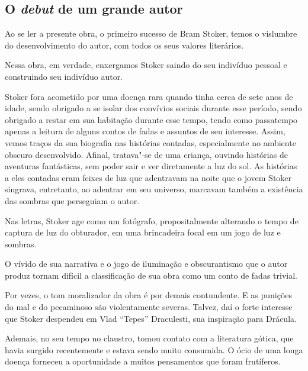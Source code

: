 \documentclass[12pt]{extarticle}
\begin{document}
\subsection{O \textit{debut} de um grande autor}

Ao se ler a presente obra, o primeiro sucesso de Bram Stoker, temos o
vislumbre do desenvolvimento do autor, com todos os seus valores
literários.

Nessa obra, em verdade, enxergamos Stoker saindo do seu indivíduo
pessoal e construindo seu indivíduo autor.

Stoker fora acometido por uma doença rara quando tinha cerca de sete
anos de idade, sendo obrigado a se isolar dos convívios sociais durante
esse período, sendo obrigado a restar em sua habitação durante esse
tempo, tendo como passatempo apenas a leitura de alguns contos de fadas
e assuntos de seu interesse. Assim, vemos traços da sua biografia nas
histórias contadas, especialmente no ambiente obscuro desenvolvido.
Afinal, tratava"-se de uma criança, ouvindo histórias de aventuras
fantásticas, sem poder sair e ver diretamente a luz do sol. As histórias
a eles contadas eram feixes de luz que adentravam na noite que o jovem
Stoker singrava, entretanto, ao adentrar em seu universo, marcavam
também a existência das sombras que perseguiam o autor.


Nas letras, Stoker age como um fotógrafo, propositalmente alterando o
tempo de captura de luz do obturador, em uma brincadeira focal em um
jogo de luz e sombras.

O vívido de sua narrativa e o jogo de iluminação e obscurantismo que o
autor produz tornam difícil a classificação de sua obra como um conto de
fadas trivial.

Por vezes, o tom moralizador da obra é por demais contundente. E as
punições do mal e do pecaminoso são violentamente severas. Talvez, daí o
forte interesse que Stoker despendeu em Vlad ``Tepes'' Draculesti, sua
inspiração para Drácula.


Ademais, no seu tempo no claustro, tomou contato com a literatura
gótica, que havia surgido recentemente e estava sendo muito consumida. O
ócio de uma longa doença forneceu a oportunidade a muitos pensamentos
que foram frutíferos.
\end{document}
